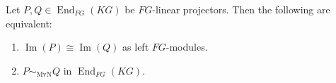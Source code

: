\documentclass[11pt]{article}
\begin{document}



\begin{proposition}\label{prop:equivalent-projectors}
Let $P,Q\in \operatorname{End}_{FG}(KG)$ be $FG$-linear projectors. Then the following are equivalent:
\begin{enumerate}
    \item $\operatorname{Im}(P)\cong \operatorname{Im}(Q)$ as left $FG$-modules.
    \item $P\sim_{\mathrm{MvN}}Q$ in $\operatorname{End}_{FG}(KG)$.
\end{enumerate}
\end{proposition}
\end{document}
